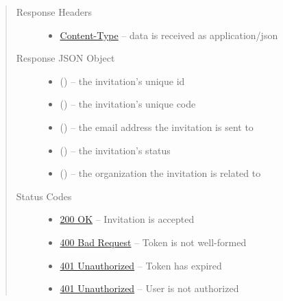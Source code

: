 \documentclass[letterpaper,10pt,english]{sphinxmanual}
\begin{document}
\begin{fulllineitems}
\begin{quote}
\begin{description}
\begin{itemize}
\end{itemize}

\item[{Response Headers}] \leavevmode\begin{itemize}
\item {} 
\href{http://tools.ietf.org/html/rfc7231\#section-3.1.1.5}{Content-Type} -- data is received as application/json

\end{itemize}

\item[{Response JSON Object}] \leavevmode\begin{itemize}
\item {} 
 () -- the invitation's unique id

\item {} 
 () -- the invitation's unique code

\item {} 
 () -- the email address the invitation is sent to

\item {} 
 () -- the invitation's status

\item {} 
 () -- the organization the invitation is related
to

\end{itemize}

\item[{Status Codes}] \leavevmode\begin{itemize}
\item {} 
\href{http://www.w3.org/Protocols/rfc2616/rfc2616-sec10.html\#sec10.2.1}{200 OK} -- Invitation is accepted

\item {} 
\href{http://www.w3.org/Protocols/rfc2616/rfc2616-sec10.html\#sec10.4.1}{400 Bad Request} -- Token is not well-formed

\item {} 
\href{http://www.w3.org/Protocols/rfc2616/rfc2616-sec10.html\#sec10.4.2}{401 Unauthorized} -- Token has expired

\item {} 
\href{http://www.w3.org/Protocols/rfc2616/rfc2616-sec10.html\#sec10.4.2}{401 Unauthorized} -- User is not authorized


\end{itemize}
\end{description}
\end{quote}
\end{fulllineitems}
\end{document}
